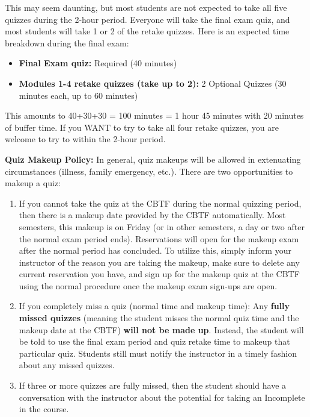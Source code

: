 \documentclass[12pt]{article}
\begin{document}
This may seem daunting, but most students are not expected to take all five quizzes during the 2-hour period. Everyone will take the final exam quiz, and most students will take 1 or 2 of the retake quizzes. Here is an expected time breakdown during the final exam:

\begin{itemize}
\item  \textbf{Final Exam quiz:} Required (40 minutes)
\item  \textbf{Modules 1-4 retake quizzes (take up to 2):} 2 Optional Quizzes (30 minutes each, up to 60 minutes)
\end{itemize}

This amounts to 40+30+30 = 100 minutes = 1 hour 45 minutes with 20 minutes of buffer time. If you WANT to try to take all four retake quizzes, you are welcome to try to within the 2-hour period. 


\textbf{Quiz Makeup Policy:} In general, quiz makeups will be allowed in extenuating circumstances (illness, family emergency, etc.). There are two opportunities to makeup a quiz:

\begin{enumerate}
    \item If you cannot take the quiz at the CBTF during the normal quizzing period, then there is a makeup date provided by the CBTF automatically. Most semesters, this makeup is on Friday (or in other semesters, a day or two after the normal exam period ends). Reservations will open for the makeup exam after the normal period has concluded. To utilize this, simply inform your instructor of the reason you are taking the makeup, make sure to delete any current reservation you have, and sign up for the makeup quiz at the CBTF using the normal procedure once the makeup exam sign-ups are open.
    \item If you completely miss a quiz (normal time and makeup time): Any \textbf{fully missed quizzes} (meaning the student misses the normal quiz time and the makeup date at the CBTF) \textbf{will not be made up}. Instead, the student will be told to use the final exam period and quiz retake time to makeup that particular quiz. Students still must notify the instructor in a timely fashion about any missed quizzes.
    \item If three or more quizzes are fully missed, then the student should have a conversation with the instructor about the potential for taking an Incomplete in the course. 
\end{enumerate}
\end{document}
